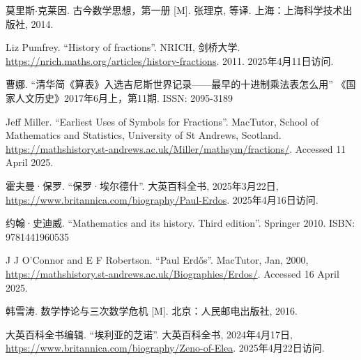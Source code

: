莫里斯$\cdot$克莱因. 古今数学思想，第一册 [M]. 张理京, 等译. 上海：上海科学技术出版社, 2014. %

Liz Pumfrey. ``History of fractions''. NRICH, 剑桥大学. \url{https://nrich.maths.org/articles/history-fractions}. 2011. 2025年4月11日访问.


曹娜. ``清华简《算表》入选吉尼斯世界记录——最早的十进制乘法表怎么用'' 《国家人文历史》2017年6月上，第11期. ISSN: 2095-3189

Jeff Miller. ``Earliest Uses of Symbols for Fractions''. MacTutor, School of Mathematics and Statistics, University of St Andrews, Scotland. \url{https://mathshistory.st-andrews.ac.uk/Miller/mathsym/fractions/}. Accessed 11 April 2025.

霍夫曼·保罗. ``保罗·埃尔德什''. 大英百科全书, 2025年3月22日, \url{https://www.britannica.com/biography/Paul-Erdos}. 2025年4月16日访问.

约翰·史迪威. ``Mathematics and its history. Third edition''. Springer 2010. ISBN: 9781441960535


J J O'Connor and E F Robertson. ``Paul Erdős''. MacTutor, Jan, 2000, \url{https://mathshistory.st-andrews.ac.uk/Biographies/Erdos/}. Accessed 16 April 2025.

韩雪涛. 数学悖论与三次数学危机 [M]. 北京：人民邮电出版社, 2016. %

大英百科全书编辑. ``埃利亚的芝诺''. 大英百科全书, 2024年4月17日, \url{https://www.britannica.com/biography/Zeno-of-Elea}. 2025年4月22日访问.

